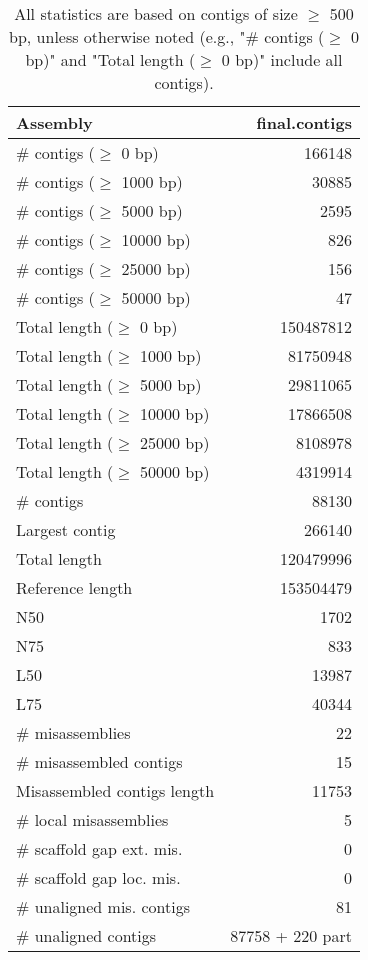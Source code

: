 \documentclass[12pt,a4paper]{article}
\begin{document}
\begin{table}[ht]
\begin{center}
\caption{All statistics are based on contigs of size $\geq$ 500 bp, unless otherwise noted (e.g., "\# contigs ($\geq$ 0 bp)" and "Total length ($\geq$ 0 bp)" include all contigs).}
\begin{tabular}{|l*{1}{|r}|}
\hline
Assembly & final.contigs \\ \hline
\# contigs ($\geq$ 0 bp) & 166148 \\ \hline
\# contigs ($\geq$ 1000 bp) & 30885 \\ \hline
\# contigs ($\geq$ 5000 bp) & 2595 \\ \hline
\# contigs ($\geq$ 10000 bp) & 826 \\ \hline
\# contigs ($\geq$ 25000 bp) & 156 \\ \hline
\# contigs ($\geq$ 50000 bp) & 47 \\ \hline
Total length ($\geq$ 0 bp) & 150487812 \\ \hline
Total length ($\geq$ 1000 bp) & 81750948 \\ \hline
Total length ($\geq$ 5000 bp) & 29811065 \\ \hline
Total length ($\geq$ 10000 bp) & 17866508 \\ \hline
Total length ($\geq$ 25000 bp) & 8108978 \\ \hline
Total length ($\geq$ 50000 bp) & 4319914 \\ \hline
\# contigs & 88130 \\ \hline
Largest contig & 266140 \\ \hline
Total length & 120479996 \\ \hline
Reference length & 153504479 \\ \hline
N50 & 1702 \\ \hline
N75 & 833 \\ \hline
L50 & 13987 \\ \hline
L75 & 40344 \\ \hline
\# misassemblies & 22 \\ \hline
\# misassembled contigs & 15 \\ \hline
Misassembled contigs length & 11753 \\ \hline
\# local misassemblies & 5 \\ \hline
\# scaffold gap ext. mis. & 0 \\ \hline
\# scaffold gap loc. mis. & 0 \\ \hline
\# unaligned mis. contigs & 81 \\ \hline
\# unaligned contigs & 87758 + 220 part \\ \hline

\end{tabular}
\end{center}
\end{table}
\end{document}
